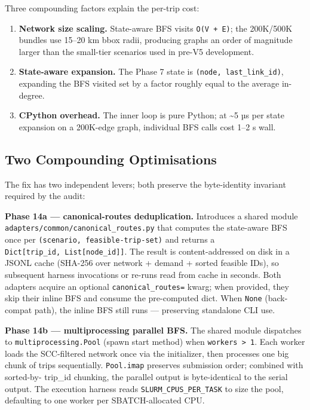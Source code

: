 Three compounding factors explain the per-trip cost:

\begin{enumerate}
\def\labelenumi{\arabic{enumi}.}
\tightlist
\item
  \textbf{Network size scaling.} State-aware BFS visits
  \texttt{O(V\ +\ E)}; the 200K/500K bundles use 15--20 km bbox radii,
  producing graphs an order of magnitude larger than the small-tier
  scenarios used in pre-V5 development.
\item
  \textbf{State-aware expansion.} The Phase 7 state is
  \texttt{(node,\ last\_link\_id)}, expanding the BFS visited set by a
  factor roughly equal to the average in-degree.
\item
  \textbf{CPython overhead.} The inner loop is pure Python; at
  \textasciitilde5 µs per state expansion on a 200K-edge graph,
  individual BFS calls cost 1--2 s wall.
\end{enumerate}

\subsection{Two Compounding
Optimisations}\label{382-two-compounding-optimisations}

The fix has two independent levers; both preserve the byte-identity
invariant required by the audit:

\textbf{Phase 14a --- canonical-routes deduplication.} Introduces a
shared module \texttt{adapters/common/canonical\_routes.py} that
computes the state-aware BFS once per
\texttt{(scenario,\ feasible-trip-set)} and returns a
\texttt{Dict{[}trip\_id,\ List{[}node\_id{]}{]}}. The result is
content-addressed on disk in a JSONL cache (SHA-256 over network +
demand + sorted feasible IDs), so subsequent harness invocations or
re-runs read from cache in seconds. Both adapters acquire an optional
\texttt{canonical\_routes=} kwarg; when provided, they skip their inline
BFS and consume the pre-computed dict. When \texttt{None} (back-compat
path), the inline BFS still runs --- preserving standalone CLI use.

\textbf{Phase 14b --- multiprocessing parallel BFS.} The shared module
dispatches to \texttt{multiprocessing.Pool} (spawn start method) when
\texttt{workers\ \textgreater{}\ 1}. Each worker loads the SCC-filtered
network once via the initializer, then processes one big chunk of trips
sequentially. \texttt{Pool.imap} preserves submission order; combined
with sorted-by- trip\_id chunking, the parallel output is byte-identical
to the serial output. The execution harness reads
\texttt{SLURM\_CPUS\_PER\_TASK} to size the pool, defaulting to one
worker per SBATCH-allocated CPU.

